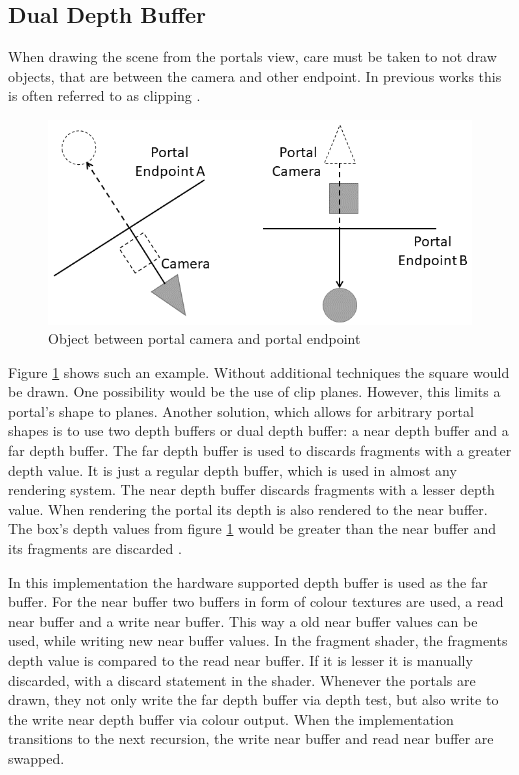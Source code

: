 \subsection{Dual Depth Buffer}

When drawing the scene from the portals view, care must be taken to not draw objects, that are between the camera and other endpoint. In previous works this is often referred to as clipping \cite{lowe:2005:technique}.
\begin{figure}[h]
	\includegraphics[width=\linewidth]{images/bananajuce.png}
	\caption{Object between portal camera and portal endpoint}
	\label{fig:bananajuce}
\end{figure}

Figure \ref{fig:bananajuce} shows such an example. Without additional techniques the square would be drawn. One possibility would be the use of clip planes. However, this limits a portal's shape to planes. Another solution, which allows for arbitrary portal shapes is to use two depth buffers or dual depth buffer: a near depth buffer and a far depth buffer. The far depth buffer is used to discards fragments with a greater depth value. It is just a regular depth buffer, which is used in almost any rendering system. The near depth buffer discards fragments with a lesser depth value. When rendering the portal its depth is also rendered to the near buffer. The box's depth values from figure \ref{fig:bananajuce} would be greater than the near buffer and its fragments are discarded \cite{lowe:2005:technique, ropinski:2004:real}.

In this implementation the hardware supported depth buffer is used as the far buffer. For the near buffer two buffers in form of colour textures are used, a read near buffer and a write near buffer. This way a old near buffer values can be used, while writing new near buffer values. In the fragment shader, the fragments depth value is compared to the read near buffer. If it is lesser it is manually discarded, with a discard statement in the shader. Whenever the portals are drawn, they not only write the far depth buffer via depth test, but also write to the write near depth buffer via colour output. When the implementation transitions to the next recursion, the write near buffer and read near buffer are swapped.

